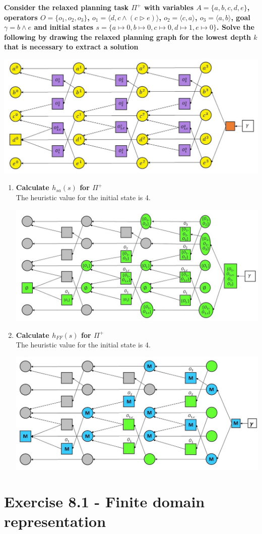 \documentclass[12pt,a4paper]{article}
\begin{document}
\textbf{Consider the relaxed planning task $\Pi^+$ with variables 
$A=\{a,b,c,d,e\}$, operators $O=\{o_1,o_2,o_3\}$, $o_1=\langle d, c \land (c \triangleright e)\rangle$,
$o_2= \langle c , a \rangle$, $o_3= \langle a, b\rangle$, goal
$\gamma = b \land e$ and initial states $s=\{ a\mapsto 0, 
b\mapsto 0, c \mapsto 0, d \mapsto 1, e \mapsto 0 \}$. Solve the following
by drawing the relaxed planning graph for the lowest depth $k$
that is necessary to extract a solution}
\begin{center}
	\includegraphics[scale=0.5]{img1.jpg}\\
\end{center}
\begin{enumerate}[label=(\alph*), listparindent=1.5em]
	\item \textbf{Calculate $h_{sa}(s)$ for $\Pi^+ $}\\
	The heuristic value for the initial state is 4.
	\begin{center}
		\includegraphics[scale=0.5]{hsa.jpg}\\
	\end{center}
	\item \textbf{Calculate $h_{FF}(s)$ for $\Pi^+ $}\\
	The heuristic value for the initial state is 4.
	\begin{center}
		\includegraphics[scale=0.5]{hff.jpg}\\
	\end{center}
\end{enumerate}

\section*{Exercise 8.1 - Finite domain representation}
\end{document}
